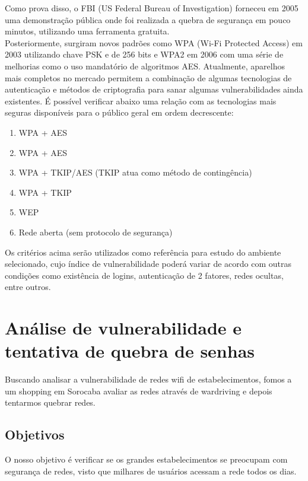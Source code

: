 \documentclass[
	article,			%
	12pt,				%
	oneside,			%
	a4paper,			%
	english,			%
	brazil,				%
	sumario=tradicional
	]{abntex2}
\begin{document}
Como prova disso, o FBI (US Federal Bureau of Investigation) forneceu em 2005 uma demonstração pública onde foi realizada a quebra de segurança em pouco minutos, utilizando uma ferramenta gratuita.\\

Posteriormente, surgiram novos padrões como WPA (Wi-Fi Protected Access) em 2003 utilizando chave PSK e de 256 bits e WPA2 em 2006 com uma série de melhorias como o uso mandatório de algoritmos AES. Atualmente, aparelhos mais completos no mercado permitem a combinação de algumas tecnologias de autenticação e métodos de criptografia para sanar algumas vulnerabilidades ainda existentes. É possível verificar abaixo uma relação com as tecnologias mais seguras disponíveis para o público geral em ordem decrescente:\\

\begin{enumerate}
\item{WPA + AES}
\item{WPA + AES}
\item{WPA + TKIP/AES (TKIP atua como método de contingência)}
\item{WPA + TKIP}
\item{WEP}
\item{Rede aberta (sem protocolo de segurança)}
\end{enumerate}

Os critérios acima serão utilizados como referência para estudo do ambiente selecionado, cujo índice de vulnerabilidade poderá variar de acordo com outras condições como existência de logins, autenticação de 2 fatores, redes ocultas, entre outros.\\

\section{Análise de vulnerabilidade e tentativa de quebra de senhas}

Buscando analisar a vulnerabilidade de redes wifi de estabelecimentos, fomos a um shopping em Sorocaba avaliar as redes através de wardriving e depois tentarmos quebrar redes.

\subsection{Objetivos}

O nosso objetivo é verificar se os grandes estabelecimentos se preocupam com segurança de redes, visto que milhares de usuários acessam a rede todos os dias.
\end{document}
